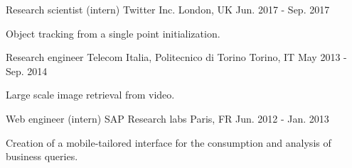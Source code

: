 

\begin{cventries}

  \cventry
    {Research scientist (intern)} %
    {Twitter Inc.} %
    {London, UK} %
    {Jun. 2017 - Sep. 2017} %
    {
      \begin{cvitems} %
        \item {Object tracking from a single point initialization.}
      \end{cvitems}
    }

  \cventry
    {Research engineer} %
    {Telecom Italia, Politecnico di Torino} %
    {Torino, IT} %
    {May 2013 - Sep. 2014} %
    {
      \begin{cvitems} %
        \item {Large scale image retrieval from video.}
      \end{cvitems}
    }

  \cventry
    {Web engineer (intern)} %
    {SAP Research labs} %
    {Paris, FR} %
    {Jun. 2012 - Jan. 2013} %
    {
      \begin{cvitems} %
        \item {Creation of a mobile-tailored interface for the consumption and analysis of business queries.}
      \end{cvitems}
    }
    
\end{cventries}

